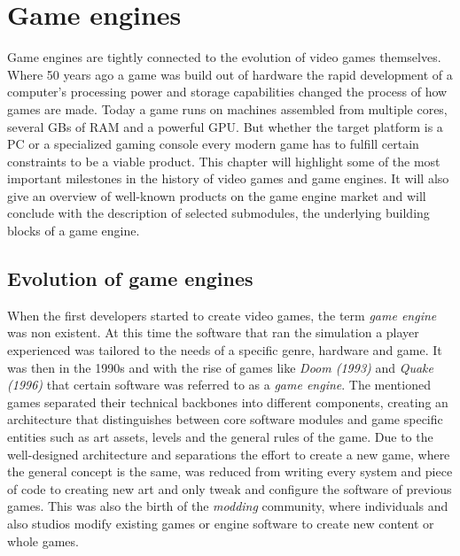 \chapter{Game engines}

Game engines are tightly connected to the evolution of video games themselves. Where 50 years ago a game was build out of hardware the rapid development of a computer's processing power and storage capabilities changed the process of how games are made. Today a game runs on machines assembled from multiple cores, several \acp{GB} of \ac{RAM} and a powerful \ac{GPU}. But whether the target platform is a PC or a specialized gaming console every modern game has to fulfill certain constraints to be a viable product. This chapter will highlight some of the most important milestones in the history of video games and game engines. It will also give an overview of well-known products on the game engine market and will conclude with the description of selected submodules, the underlying building blocks of a game engine.

\section{Evolution of game engines}

When the first developers started to create video games, the term \textit{game engine} was non existent. At this time the software that ran the simulation a player experienced was tailored to the needs of a specific genre, hardware and game. It was then in the 1990s and with the rise of games like \textit{Doom (1993)} and \textit{Quake (1996)} that certain software was referred to as a \textit{game engine}. The mentioned games separated their technical backbones into different components, creating an architecture that distinguishes between core software modules and game specific entities such as art assets, levels and the general rules of the game. Due to the well-designed architecture and separations the effort to create a new game, where the general concept is the same, was reduced from writing every system and piece of code to creating new art and only tweak and configure the software of previous games. This was also the birth of the \textit{modding} community, where individuals and also studios modify existing games or engine software to create new content or whole games.

